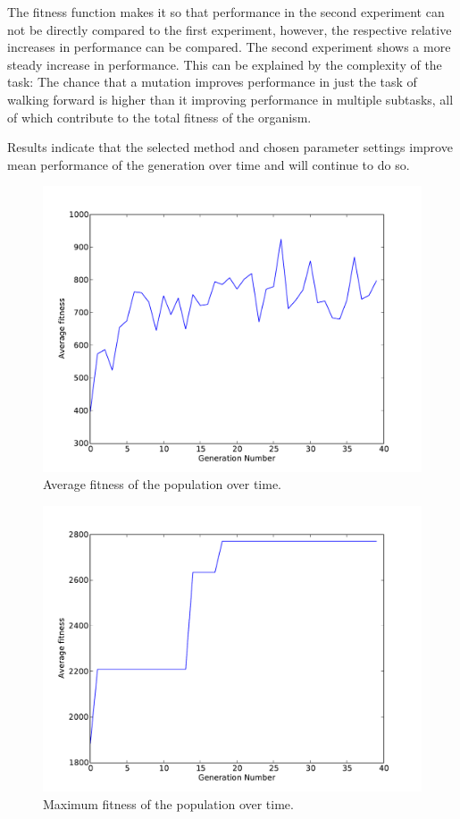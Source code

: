 \documentclass{article}
\begin{document}
The fitness function makes it so that performance in the second experiment can not be directly compared to the first experiment, however, the respective relative increases in performance can be compared. The second experiment shows a more steady increase in performance. This can be explained by the complexity of the task: The chance that a mutation improves performance in just the task of walking forward is higher than it improving performance in multiple subtasks, all of which contribute to the total fitness of the organism. 

Results indicate that the selected method and chosen parameter settings improve mean performance of the generation over time and will continue to do so. 
\newpage
\begin{figure}[h!]
	\center
	\includegraphics[width=.8\textwidth]{images/fitness}
	\caption{Average fitness of the population over time.}
	\label{fig:avg}
\end{figure}

\begin{figure}[h!]
	\center
	\includegraphics[width=.8\textwidth]{images/max_fitness}
	\caption{Maximum fitness of the population over time.}
	\label{fig:max}
\end{figure}
\newpage
\end{document}
